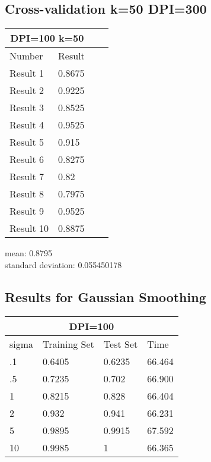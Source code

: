 \documentclass[paper=a4, fontsize=11pt]{scrartcl} %
\numberwithin{equation}{section} %
\numberwithin{figure}{section} %
\numberwithin{table}{section} %
\begin{document}
\subsection*{Cross-validation k=50 DPI=300}
\begin{center}
\begin{tabular}{ |p{3cm}|p{3cm}|p{3cm}|p{3cm}|  }
 \hline
 \multicolumn{2}{|c|}{DPI=100 k=50} \\
 \hline
 Number & Result\\
 \hline
 Result 1 & 0.8675 \\
 Result 2 & 0.9225 \\
 Result 3 & 0.8525 \\
 Result 4 & 0.9525\\ 
 Result 5 & 0.915 \\
 Result 6 & 0.8275 \\
 Result 7 & 0.82 \\
 Result 8 & 0.7975 \\
 Result 9 & 0.9525 \\
 Result 10 & 0.8875\\
 \hline
\end{tabular}
\end{center}
\begin{center}
mean: 0.8795\\
standard deviation: 0.055450178\\
\end{center}

\subsection*{Results for Gaussian Smoothing}
\begin{tabular}{ |p{3cm}|p{3cm}|p{3cm}|p{3cm}|  }
 \hline
 \multicolumn{4}{|c|}{DPI=100} \\
 \hline
 sigma & Training Set & Test Set & Time\\
 \hline
 .1 & 0.6405 & 0.6235 & 66.464\\
 .5 & 0.7235 & 0.702 & 66.900\\
 1 & 0.8215 & 0.828 & 66.404\\
 2 & 0.932 & 0.941 & 66.231\\
 5 & 0.9895 & 0.9915 & 67.592\\
 10 & 0.9985 & 1 & 66.365\\
 \hline
\end{tabular}



\end{document}
